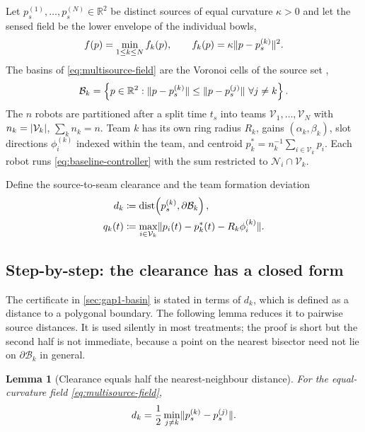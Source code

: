 \documentclass[11pt,a4paper]{article}
\theoremstyle{plain}
\newtheorem{lemma}{Lemma}
\theoremstyle{definition}
\newcommand{\R}{\mathbb{R}}
\newcommand{\V}{\mathcal{V}}
\DeclareMathOperator{\dist}{dist}
\DeclarePairedDelimiter{\norm}{\lVert}{\rVert}
\DeclarePairedDelimiter{\abs}{\lvert}{\rvert}
\begin{document}
Let $p_s^{(1)},\ldots,p_s^{(N)}\in\R^2$ be distinct sources of equal curvature $\kappa>0$ and let
the sensed field be the lower envelope of the individual bowls,
\begin{equation}\label{eq:multisource-field}
    f(p)=\min_{1\leq k\leq N}f_k(p),
    \qquad f_k(p)=\kappa\norm{p-p_s^{(k)}}^2.
\end{equation}
The basins of \eqref{eq:multisource-field} are the Voronoi cells of the source set
\cite{cortes2004},
\begin{equation}\label{eq:voronoi}
    \mathcal{B}_k=\left\{p\in\R^2:\norm{p-p_s^{(k)}}\leq\norm{p-p_s^{(j)}}\ \forall j\neq k\right\}.
\end{equation}
The $n$ robots are partitioned after a split time $t_s$ into teams $\V_1,\ldots,\V_N$ with
$n_k=\abs{\V_k}$, $\sum_kn_k=n$. Team $k$ has its own ring radius $R_k$, gains
$(\alpha_k,\beta_k)$, slot directions $\phi_i^{(k)}$ indexed within the team, and centroid
$p_k^*=n_k^{-1}\sum_{i\in\V_k}p_i$. Each robot runs \eqref{eq:baseline-controller} with the sum
restricted to $\mathcal{N}_i\cap\V_k$.

Define the source-to-seam clearance and the team formation deviation
\begin{align}
    d_k&\coloneqq\dist\!\left(p_s^{(k)},\partial\mathcal{B}_k\right),\label{eq:clearance-def}\\
    q_k(t)&\coloneqq\max_{i\in\V_k}\norm{p_i(t)-p_k^*(t)-R_k\phi_i^{(k)}}.\label{eq:team-deviation}
\end{align}

\subsection{Step-by-step: the clearance has a closed form}\label{sec:gap1-clearance}

The certificate in \cref{sec:gap1-basin} is stated in terms of $d_k$, which is defined as a
distance to a polygonal boundary. The following lemma reduces it to pairwise source distances.
It is used silently in most treatments; the proof is short but the second half is not immediate,
because a point on the nearest bisector need not lie on $\partial\mathcal{B}_k$ in general.

\begin{lemma}[Clearance equals half the nearest-neighbour distance]\label{lem:clearance}
For the equal-curvature field \eqref{eq:multisource-field},
\begin{equation}\label{eq:clearance-closed-form}
    d_k=\frac12\min_{j\neq k}\norm{p_s^{(k)}-p_s^{(j)}}.
\end{equation}
\end{lemma}
\end{document}
